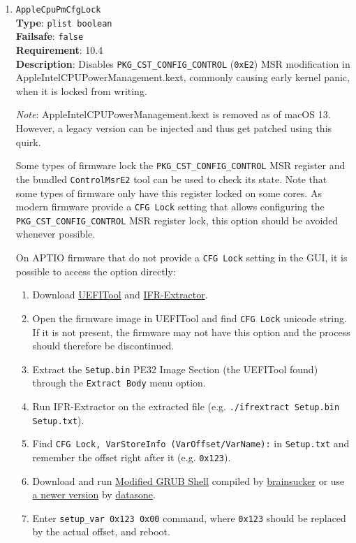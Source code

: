 \documentclass[]{article}
\providecommand{\tightlist}{%
  \setlength{\itemsep}{0pt}\setlength{\parskip}{0pt}}
\begin{document}
\begin{enumerate}

\item
  \texttt{AppleCpuPmCfgLock}\\
  \textbf{Type}: \texttt{plist\ boolean}\\
  \textbf{Failsafe}: \texttt{false}\\
  \textbf{Requirement}: 10.4\\
  \textbf{Description}: Disables \texttt{PKG\_CST\_CONFIG\_CONTROL} (\texttt{0xE2})
  MSR modification in AppleIntelCPUPowerManagement.kext, commonly causing early
  kernel panic, when it is locked from writing.

  \emph{Note}: AppleIntelCPUPowerManagement.kext is removed as of macOS 13.
  However, a legacy version can be injected and thus get patched using this quirk.

  Some types of firmware lock the \texttt{PKG\_CST\_CONFIG\_CONTROL} MSR
  register and the bundled \texttt{ControlMsrE2} tool can be used to check its
  state. Note that some types of firmware only have this register locked on some
  cores. As modern firmware provide a \texttt{CFG Lock} setting that allows
  configuring the \texttt{PKG\_CST\_CONFIG\_CONTROL} MSR register lock, this
  option should be avoided whenever possible.

  On APTIO firmware that do not provide a \texttt{CFG Lock}
  setting in the GUI, it is possible to access the option directly:

  \begin{enumerate}
    \tightlist
    \item Download \href{https://github.com/LongSoft/UEFITool/releases}{UEFITool} and
      \href{https://github.com/LongSoft/Universal-IFR-Extractor/releases}{IFR-Extractor}.
    \item Open the firmware image in UEFITool and find \texttt{CFG Lock} unicode string.
      If it is not present, the firmware may not have this option and the process should therefore be discontinued.
    \item Extract the \texttt{Setup.bin} PE32 Image Section (the UEFITool found) through the
      \texttt{Extract Body} menu option.
    \item Run IFR-Extractor on the extracted file (e.g. \texttt{./ifrextract Setup.bin Setup.txt}).
    \item Find \texttt{CFG Lock, VarStoreInfo (VarOffset/VarName):} in \texttt{Setup.txt} and
      remember the offset right after it (e.g. \texttt{0x123}).
    \item Download and run \href{http://brains.by/posts/bootx64.7z}{Modified GRUB Shell} compiled by
      \href{https://habr.com/geektimes/post/258090}{brainsucker} or use
      \href{https://github.com/datasone/grub-mod-setup_var}{a newer version} by
      \href{https://github.com/datasone}{datasone}.
    \item Enter \texttt{setup\_var 0x123 0x00} command, where \texttt{0x123} should be replaced by
      the actual offset, and reboot.
  \end{enumerate}


\end{enumerate}
\end{document}

